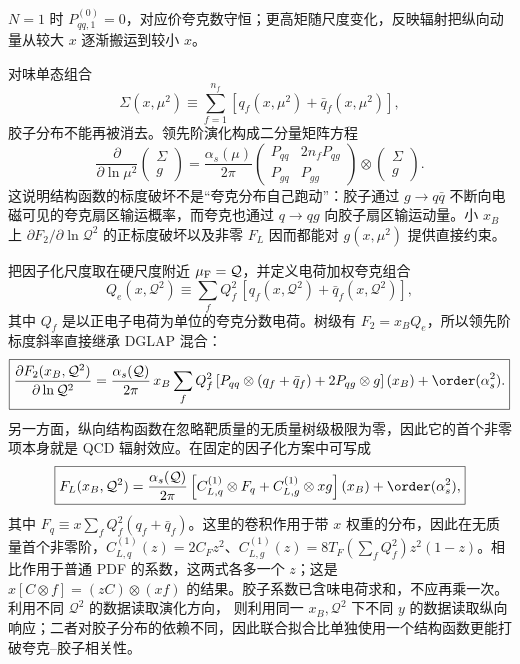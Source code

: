 $N=1$ 时 $P_{qq,1}^{(0)}=0$，对应价夸克数守恒；更高矩随尺度变化，反映辐射把纵向动量从较大 $x$ 逐渐搬运到较小 $x$。

对味单态组合
\begin{equation*}
 \Sigma(x,\mu^2)
 \equiv\sum_{f=1}^{n_f}\left[q_f(x,\mu^2)+\bar q_f(x,\mu^2)\right],
\end{equation*}
胶子分布不能再被消去。领先阶演化构成二分量矩阵方程
\begin{equation}
 \boxed{
 \frac{\partial}{\partial\ln\mu^2}
 \begin{pmatrix}\Sigma\\ g\end{pmatrix}
 =\frac{\alpha_s(\mu)}{2\pi}
 \begin{pmatrix}
 P_{qq} & 2n_fP_{qg}\\
 P_{gq} & P_{gg}
 \end{pmatrix}
 \otimes
 \begin{pmatrix}\Sigma\\ g\end{pmatrix}.}
 \label{eq:dis-singlet-gluon-dglap-dp31}
\end{equation}
这说明结构函数的标度破坏不是“夸克分布自己跑动”：胶子通过 $g\to q\bar q$ 不断向电磁可见的夸克扇区输运概率，而夸克也通过 $q\to qg$ 向胶子扇区输运动量。小 $x_B$ 上 $\partial F_2/\partial\ln\mathcal Q^2$ 的正标度破坏以及非零 $F_L$ 因而都能对 $g(x,\mu^2)$ 提供直接约束。

把因子化尺度取在硬尺度附近 $\mu_{\rm F}=\mathcal Q$，并定义电荷加权夸克组合
\begin{equation*}
 Q_e(x,\mathcal Q^2)
 \equiv\sum_f Q_f^2\,[q_f(x,\mathcal Q^2)+\bar q_f(x,\mathcal Q^2)],
\end{equation*}
其中 $Q_f$ 是以正电子电荷为单位的夸克分数电荷。树级有 $F_2=x_BQ_e$，所以领先阶标度斜率直接继承 DGLAP 混合：
\begin{equation}
 \boxed{
 \frac{\partial F_2(x_B,\mathcal Q^2)}{\partial\ln\mathcal Q^2}
 =\frac{\alpha_s(\mathcal Q)}{2\pi}\,x_B
 \sum_f Q_f^2\left[
 P_{qq}\otimes(q_f+\bar q_f)
 +2P_{qg}\otimes g
 \right](x_B)
 +\order(\alpha_s^2).}
 \label{eq:dis-f2-scaling-violation-dp32}
\end{equation}
另一方面，纵向结构函数在忽略靶质量的无质量树级极限为零，因此它的首个非零项本身就是 QCD 辐射效应。在固定的因子化方案中可写成
\begin{equation}
 \boxed{
 F_L(x_B,\mathcal Q^2)
 =\frac{\alpha_s(\mathcal Q)}{2\pi}
 \left[
 C_{L,q}^{(1)}\otimes F_q
 +C_{L,g}^{(1)}\otimes xg
 \right](x_B)
 +\order(\alpha_s^2),}
 \label{eq:dis-fl-gluon-interface-dp32}
\end{equation}
其中 $F_q\equiv x\sum_f Q_f^2(q_f+\bar q_f)$。这里的卷积作用于带 $x$ 权重的分布，因此在无质量首个非零阶，$C_{L,q}^{(1)}(z)=2C_Fz^2$、$C_{L,g}^{(1)}(z)=8T_F(\sum_fQ_f^2)z^2(1-z)$。相比作用于普通 PDF 的系数，这两式各多一个 $z$；这是 $x[C\otimes f]=(zC)\otimes(xf)$ 的结果。胶子系数已含味电荷求和，不应再乘一次。 利用不同 $\mathcal Q^2$ 的数据读取演化方向， 则利用同一 $x_B,\mathcal Q^2$ 下不同 $y$ 的数据读取纵向响应；二者对胶子分布的依赖不同，因此联合拟合比单独使用一个结构函数更能打破夸克--胶子相关性。

